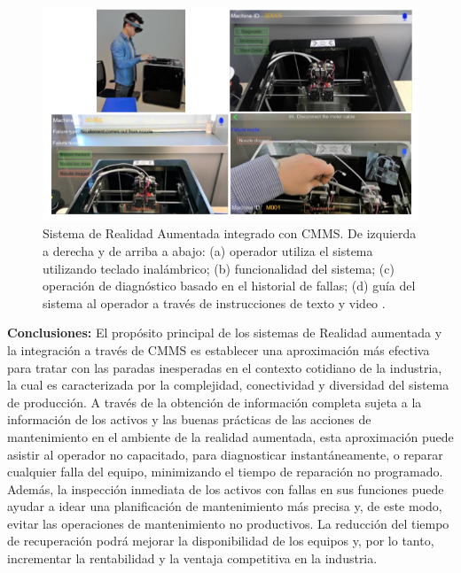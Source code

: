 \begin{description}
\begin{figure}[H]
\centering
\includegraphics[scale=0.7]{images/arsistema.png}
\caption{Sistema de Realidad Aumentada integrado con CMMS. De izquierda a derecha y de arriba a abajo: (a) operador utiliza el sistema utilizando teclado inalámbrico; (b) funcionalidad del sistema; (c) operación de diagnóstico basado en el historial de fallas; (d) guía del sistema al operador a través de instrucciones de texto y video \parencite{aransyash2019}.}
\end{figure} 
\end{description}

\begin{description}
\item \textbf{Conclusiones:} El propósito principal de los sistemas de Realidad aumentada y la integración a través de CMMS es establecer una aproximación más efectiva para tratar con las paradas inesperadas en el contexto cotidiano de la industria, la cual es caracterizada por la complejidad, conectividad y diversidad del sistema de producción. A través de la obtención de información completa sujeta a la información de los activos y las buenas prácticas de las acciones de mantenimiento en el ambiente de la realidad aumentada, esta aproximación puede asistir al operador no capacitado, para diagnosticar instantáneamente, o reparar cualquier falla del equipo, minimizando el tiempo de reparación no programado. Además, la inspección inmediata de los activos con fallas en sus funciones puede ayudar a idear una planificación de mantenimiento más precisa y, de este modo, evitar las operaciones de mantenimiento no productivos. La reducción del tiempo de recuperación podrá mejorar la disponibilidad de los equipos y, por lo tanto, incrementar la rentabilidad y la ventaja competitiva en la industria.
\end{description}
